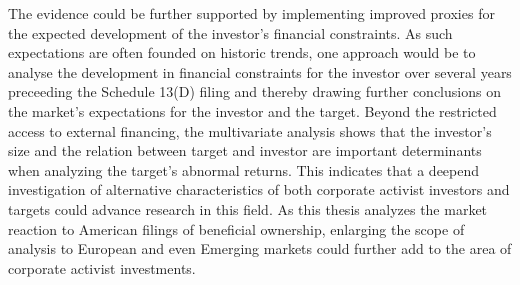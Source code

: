 \documentclass[12pt]{article}
\begin{document}
The evidence could be further supported by implementing improved proxies for the expected development of the investor's financial constraints. As such expectations are often founded on historic trends, one approach would be to analyse the development in financial constraints for the investor over several years preceeding the Schedule 13(D) filing and thereby drawing further conclusions on the market's expectations for the investor and the target. Beyond the restricted access to external financing, the multivariate analysis shows that the investor's size and the relation between target and investor are important determinants when analyzing the target's abnormal returns. This indicates that a deepend investigation of alternative characteristics of both corporate activist investors and targets could advance research in this field. As this thesis analyzes the market reaction to American filings of beneficial ownership, enlarging the scope of analysis to European and even Emerging markets could further add to the area of corporate activist investments.
\end{document}
